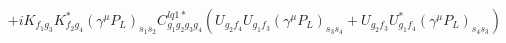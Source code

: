 %
\begin{dmath*}
%
  +  iK_{f_1 g_3} K_{f_2 g_4}^* (\gamma^{\mu} P_L)_{s_1 s_2} C^{lq1*}_{g_1 g_2 g_3 g_4} \left(U_{g_2 f_4} U_{g_1 f_3} (\gamma^{\mu} P_L)_{s_3 s_4} + U_{g_2 f_3} U_{g_1 f_4}^* (\gamma^{\mu} P_L)_{s_4 s_3}\right)
%
\end{dmath*}
%
